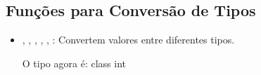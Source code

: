 \documentclass[letterpaper,10pt,english]{jupyterBook}
\begin{document}
\subsection{Funções para Conversão de Tipos}
\label{\detokenize{chapters/ch5/ch5:funcoes-para-conversao-de-tipos}}\begin{itemize}
\item {} 
\sphinxAtStartPar
{}, , , , , : Convertem valores entre diferentes tipos.

\begin{sphinxVerbatim}[commandchars=\\\{\}]
  
  
\end{sphinxVerbatim}

\begin{sphinxVerbatim}[commandchars=\\\{\}]
O tipo agora é: \PYGZlt{}class \PYGZsq{}int\PYGZsq{}\PYGZgt{}
\end{sphinxVerbatim}

\end{itemize}
\end{document}
